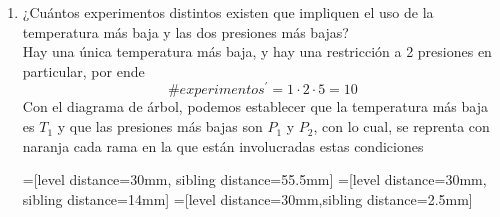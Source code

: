 \begin{enumerate}
\begin{center}
            \end{center}
        \item ¿Cuántos experimentos distintos existen que impliquen el uso de la temperatura más baja y las dos presiones más bajas?\e\\
            Hay una única temperatura más baja, y hay una restricción a 2 presiones en particular, por ende\[\#experimentos^\prime=1\cdot2\cdot5=10\]
            Con el diagrama de árbol, podemos establecer que la temperatura más baja es $T_1$ y que las presiones más bajas son $P_1$ y $P_2$, con lo cual, se reprenta con naranja cada rama en la que están involucradas estas condiciones
            \begin{center}
                =[level distance=30mm, sibling distance=55.5mm]
                =[level distance=30mm, sibling distance=14mm]
                =[level distance=30mm,sibling distance=2.5mm]
\end{center}
\end{enumerate}
